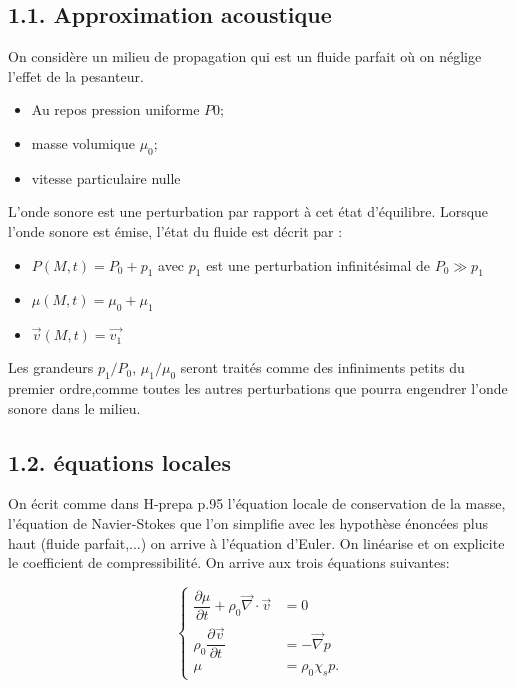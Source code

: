 \documentclass[french, a4paper, 10pt, twocolumn, landscape]{article}
\begin{document}
\subsection*{1.1. Approximation acoustique}
On considère un milieu de propagation qui est un fluide parfait où on néglige l'effet de la pesanteur. 
\begin{itemize}
  \item Au repos pression uniforme $P0$;
  \item masse volumique $\mu_0$;
  \item vitesse particulaire nulle
\end{itemize}
L'onde sonore est une perturbation par rapport à cet état d'équilibre. Lorsque l'onde sonore est émise, l'état du fluide est décrit par : 

\begin{itemize}
  \item $P(M,t) = P_0+p_1$ avec $p_1$ est une perturbation infinitésimal de $P_0\gg p_1$
  \item $\mu(M,t) = \mu_0 +\mu_1$
  \item $\vec{v}(M,t) = \vec{v_1}$
\end{itemize}

Les grandeurs $p_1/P_0$, $\mu_1/\mu_0$ seront traités comme des infiniments petits du premier ordre,comme toutes les autres perturbations que pourra engendrer l'onde sonore dans le milieu.

\subsection*{1.2. équations locales}

On écrit comme dans H-prepa p.95 l'équation locale de conservation de la masse, l'équation de Navier-Stokes que l'on simplifie avec les hypothèse énoncées plus haut (fluide parfait,...) on arrive à l'équation d'Euler. On linéarise et on explicite le coefficient de compressibilité. On arrive aux trois équations suivantes:

\begin{equation}
  \left\{\begin{array}{ll}
    \dfrac{\partial \mu}{\partial t}+\rho_0\vec{\nabla}\cdot \vec{v} &= 0\\
    \rho_0\dfrac{\partial \vec{v}}{\partial t} &=-\vec{\nabla}p\\
    \mu &= \rho_0\chi_s p.
  \end{array}\right.
\end{equation}
\end{document}
